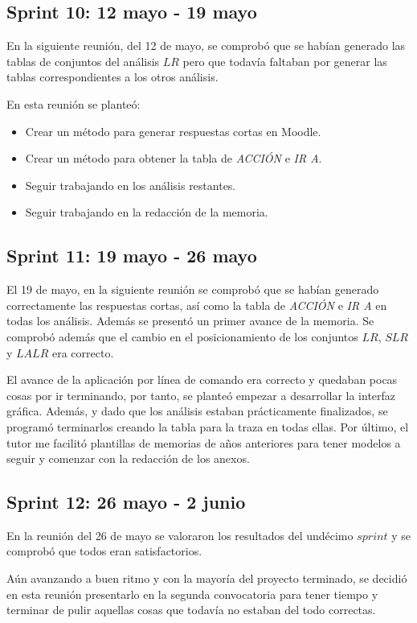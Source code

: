 \subsection{Sprint 10: 12 mayo - 19 mayo}
En la siguiente reunión, del 12 de mayo, se comprobó que se habían generado las tablas de conjuntos del análisis $LR$ pero que todavía faltaban por generar las tablas correspondientes a los otros análisis.

En esta reunión se planteó:
\begin{itemize}
\item Crear un método para generar respuestas cortas en Moodle.
\item Crear un método para obtener la tabla de \textit{ACCIÓN} e \textit{IR A}.
\item Seguir trabajando en los análisis restantes.
\item Seguir trabajando en la redacción de la memoria.
\end{itemize}


\subsection{Sprint 11: 19 mayo - 26 mayo}
El 19 de mayo, en la siguiente reunión se comprobó que se habían generado correctamente las respuestas cortas, así como la tabla de \textit{ACCIÓN} e \textit{IR A} en todas los análisis. 
Además se presentó un primer avance de la memoria.
Se comprobó además que el cambio en el posicionamiento de los conjuntos $LR$, $SLR$ y $LALR$ era correcto.

El avance de la aplicación por línea de comando era correcto y quedaban pocas cosas por ir terminando, por tanto, se planteó empezar a desarrollar la interfaz gráfica.
Además, y dado que los análisis estaban prácticamente finalizados, se programó terminarlos creando la tabla para la traza en todas ellas.
Por último, el tutor me facilitó plantillas de memorias de años anteriores para tener modelos a seguir y comenzar con la redacción de los anexos.

\subsection{Sprint 12: 26 mayo - 2 junio}
En la reunión del 26 de mayo se valoraron los resultados del undécimo $sprint$ y se comprobó que todos eran satisfactorios.

Aún avanzando a buen ritmo y con la mayoría del proyecto terminado, se decidió en esta reunión presentarlo en la segunda convocatoria para tener tiempo y terminar de pulir aquellas cosas que todavía no estaban del todo correctas.


